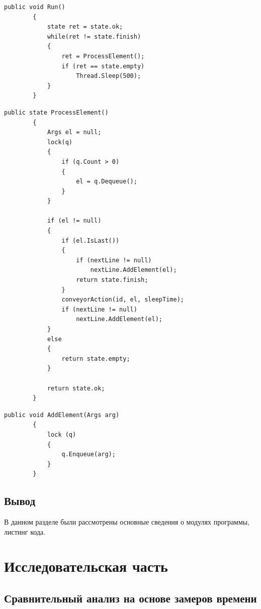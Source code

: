 \documentclass[12pt]{report}
\begin{document}
\begin{lstlisting}[label=some-code,caption=Функция для запуска в потоке]
public void Run()
        {
            state ret = state.ok;
            while(ret != state.finish)
            {
                ret = ProcessElement();
                if (ret == state.empty)
                    Thread.Sleep(500);
            }
        }
\end{lstlisting}

\begin{lstlisting}[label=some-code,caption=Обработка элемента]
public state ProcessElement()
        {
            Args el = null;
            lock(q)
            {
                if (q.Count > 0)
                {
                    el = q.Dequeue();
                }
            }
            
            if (el != null)
            {
                if (el.IsLast())
                {
                    if (nextLine != null)
                        nextLine.AddElement(el);
                    return state.finish;
                }
                conveyorAction(id, el, sleepTime);
                if (nextLine != null)
                    nextLine.AddElement(el);
            }
            else
            {
                return state.empty;
            }

            return state.ok;
        }
\end{lstlisting}


\begin{lstlisting}[label=some-code,caption=Добавление элемента в очередь]
public void AddElement(Args arg)
        {
            lock (q)
            {
                q.Enqueue(arg);
            }
        }
\end{lstlisting}

\section{Вывод}
В данном разделе были рассмотрены основные сведения о модулях программы, листинг кода.


\chapter{Исследовательская часть}

\section{Сравнительный анализ на основе замеров времени}
\end{document}
